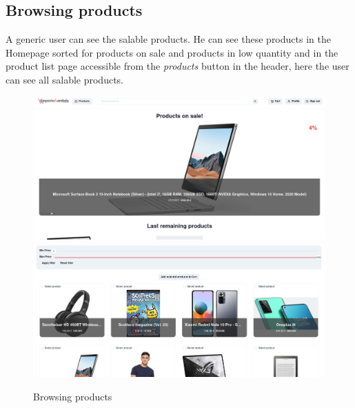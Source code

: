 \subsection{Browsing products}
A generic user can see the salable products. He can see these products in the Homepage sorted for products on sale and products in low quantity and in the product list page accessible from the \textit{products} button in the header, here the user can see all salable products.
\begin{figure}[!ht]
    \caption{Browsing products}
    \vspace{10px}
    \includegraphics[scale=0.2]{../../../../Images/userManual/home.png}
    \includegraphics[scale=0.3]{../../../../Images/userManual/PLP.png}

    \centering
\end{figure}

